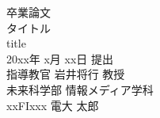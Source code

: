 \thispagestyle{empty}
\begin{center}
\vspace*{-1cm}
\Huge{卒業論文}\\
\vspace{1cm}
\LARGE{タイトル}\\

\vspace{0.2cm}
\large{title}\\
\vspace{2cm}
\Large{20xx年 x月 xx日 提出}\\
\vspace{2cm}
\LARGE{指導教官 岩井将行 教授}\\
\vspace{1cm}
\LARGE{未来科学部 情報メディア学科}\\
\vspace{1cm}
\huge{xxFIxxx 電大 太郎}\\
\end{center}
